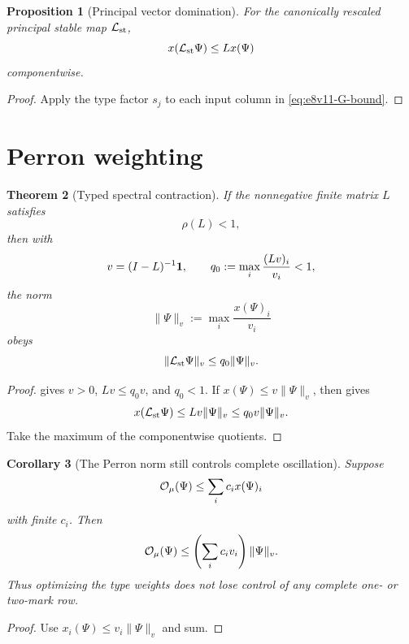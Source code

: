 \documentclass[11pt,oneside]{book}
\newtheorem{theorem}{Theorem}[chapter]
\newtheorem{proposition}[theorem]{Proposition}
\newtheorem{corollary}[theorem]{Corollary}
\theoremstyle{definition}
\theoremstyle{remark}
\begin{document}
\begin{proposition}[Principal vector domination]
\label{prop:e8v11-principal}
For the canonically rescaled principal stable map
\({\cal L}_{\rm st}\),
\[
 x({\cal L}_{\rm st}\Psi)\le Lx(\Psi)               \label{eq:e8v11-principal}
\]
componentwise.
\end{proposition}

\begin{proof}
Apply the type factor \(s_j\) to each input column in
\eqref{eq:e8v11-G-bound}.
\end{proof}

\section{Perron weighting}
\label{sec:e8v11-Perron}

\begin{theorem}[Typed spectral contraction]
\label{thm:e8v11-spectral}
If the nonnegative finite matrix \(L\) satisfies
\[
 \rho(L)<1,                                         \label{eq:e8v11-rho}
\]
then with
\[
 v=(I-L)^{-1}{\bf1},\qquad
 q_0:=\max_i\frac{(Lv)_i}{v_i}<1,                   \label{eq:e8v11-vq}
\]
the norm
\[
 \|\Psi\|_v:=\max_i\frac{x(\Psi)_i}{v_i}            \label{eq:e8v11-vnorm}
\]
obeys
\[
 \|{\cal L}_{\rm st}\Psi\|_v\le q_0\|\Psi\|_v.      \label{eq:e8v11-linear-contraction}
\]
\end{theorem}

\begin{proof}
 gives \(v>0\), \(Lv\le q_0v\), and
\(q_0<1\).  If \(x(\Psi)\le v\|\Psi\|_v\), then
 gives
\[
 x({\cal L}_{\rm st}\Psi)
 \le Lv\|\Psi\|_v
 \le q_0v\|\Psi\|_v.
\]
Take the maximum of the componentwise quotients.
\end{proof}

\begin{corollary}[The Perron norm still controls complete oscillation]
\label{cor:e8v11-oscillation}
Suppose
\[
 {\cal O}_\mu(\Psi)\le\sum_i c_i x(\Psi)_i           \label{eq:e8v11-Otype}
\]
with finite \(c_i\).  Then
\[
 {\cal O}_\mu(\Psi)
 \le\left(\sum_i c_iv_i\right)\|\Psi\|_v.           \label{eq:e8v11-Ov}
\]
Thus optimizing the type weights does not lose control of any
complete one- or two-mark row.
\end{corollary}

\begin{proof}
Use \(x_i(\Psi)\le v_i\|\Psi\|_v\) and sum.
\end{proof}
\end{document}
